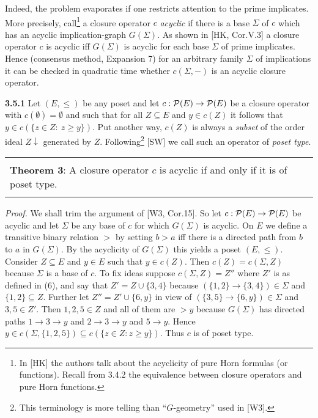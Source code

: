 \documentclass[11pt]{article}
\newcommand{\ra}{\rightarrow}
\begin{document}
Indeed, the problem evaporates if one restricts attention to the prime implicates. More precisely, call\footnote{In [HK] the authors talk about the acyclicity of pure Horn formulas (or functions). Recall from  3.4.2 the equivalence between closure operators and pure Horn functions.} a closure operator $c$ {\it acyclic} if there is a base $\Sigma$ of $c$ which has an acyclic implication-graph $G(\Sigma)$. As shown in [HK, Cor.V.3] a  closure operator $c$ is acyclic iff $G(\Sigma)$ is acyclic for each base $\Sigma$ of prime implicates. Hence (consensus method, Expansion 7) for an arbitrary family $\Sigma$ of implications it can be checked in quadratic time whether $c(\Sigma, -)$ is an acyclic closure operator.

{\bf 3.5.1} Let $(E, \leq)$ be any poset and let $c: {\cal P}(E) \ra {\cal P}(E)$ be a closure operator with $c(\emptyset) = \emptyset$ and such that for all $Z \subseteq E$ and $y \in c(Z)$ it follows that $y \in c(\{z \in Z: \ z \geq y \})$. Put another way, $c(Z)$ is always a {\it subset} of the order ideal $Z \downarrow$ generated by $Z$. Following\footnote{This terminology is more telling than ``$G$-geometry'' used in [W3].} [SW] we call such an operator of {\it poset type}.

\begin{tabular}{|l|} \hline \\
{\bf Theorem 3}: A closure operator $c$ is acyclic if and only if it is of poset type.\\ \\ \hline \end{tabular}

{\it Proof.} We shall trim the argument of [W3, Cor.15]. So let $c: {\cal P}(E) \ra {\cal P}(E)$ be acyclic and let $\Sigma$ be any base of $c$ for which $G(\Sigma)$ is acyclic. On $E$ we define a transitive binary relation $>$ by setting $b > a$ iff there is a directed path from $b$ to $a$ in $G(\Sigma)$. By the acyclicity of $G(\Sigma)$ this yields a poset $(E,\leq)$. Consider $Z \subseteq E$ and $y \in E$ such that $y \in c(Z)$. Then $c(Z) = c(\Sigma, Z)$ because $\Sigma$ is a base of $c$. To fix ideas suppose $c(\Sigma, Z) = Z''$ where $Z'$ is as defined in (6), and say that $Z' = Z \cup \{3,4\}$ because $(\{1,2\} \ra \{3,4\}) \in \Sigma$ and $\{1,2\} \subseteq Z$. Further let $Z'' = Z'\cup \{6,y\}$ in view of $(\{3,5\} \ra \{6,y\}) \in \Sigma$ and $3,5 \in Z'$. Then $1, 2, 5 \in Z$ and all of them are $> y$ because $G(\Sigma)$ has directed paths $1 \ra 3 \ra y$ and $2 \ra 3 \ra y$ and $5 \ra y$. Hence $y \in c(\Sigma, \{1,2,5\}) \subseteq c(\{z\in Z: z \geq y\})$. Thus $c$ is of poset type.
\end{document}
